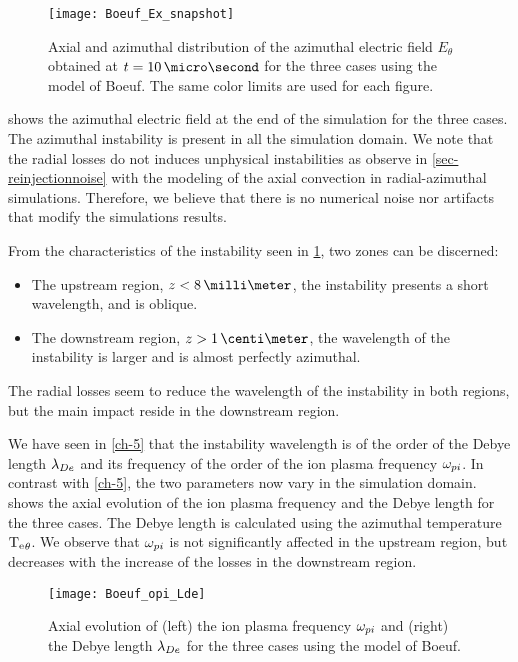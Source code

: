 \begin{figure}[hbt]
  \centering
  \texttt{[image: Boeuf\_Ex\_snapshot]}
  \caption{Axial and azimuthal distribution of the azimuthal electric field $E_{\theta}$  obtained at $t=10 \,\micro\second$ for the three cases using the model of Boeuf. The same color limits are used for each figure.}
  \label{fig-snapshots}
\end{figure}

 shows the azimuthal electric field at the end of the simulation for the three cases.
The azimuthal instability is present in all the simulation domain.
We note that the radial losses do not induces unphysical instabilities as observe in \cref{sec-reinjectionnoise} with the modeling of the axial convection in radial-azimuthal simulations.
Therefore, we believe that there is no numerical noise nor artifacts that modify the simulations results.

From the characteristics of the instability seen in \cref{fig-snapshots}, two zones can be discerned\string:
\begin{itemize}
  \item The upstream region, $z < 8 \,\milli\meter$, the instability presents a short wavelength, and is oblique.
  \item The downstream region, $z > 1\,\centi\meter$, the wavelength of the instability is larger and is almost perfectly azimuthal.
\end{itemize}
The radial losses seem to reduce the wavelength of the instability in both regions, but the main impact reside in the downstream region.


We have seen in \cref{ch-5} that the instability wavelength is of the order of the Debye length $\lambda_{De}$ and its frequency of the order of the ion plasma frequency $\omega_{pi}$.
In contrast with \cref{ch-5}, the two parameters now vary in the simulation domain.
 shows the axial evolution of the ion plasma frequency and the Debye length for the three cases.
The Debye length is calculated using the azimuthal temperature $\mathrm{T_e}_{\theta}$.
We observe that $\omega_{pi}$ is not significantly affected in the upstream region, but decreases with the increase of the losses in the downstream region.

\begin{figure}[hbt]
  \centering
  \texttt{[image: Boeuf\_opi\_Lde]}
  \caption{Axial evolution of (left) the ion plasma frequency $\omega_{pi}$ and (right) the Debye length $\lambda_{De}$ for the three cases using the model of Boeuf.}
  \label{fig-wpi_Lde}
\end{figure}


